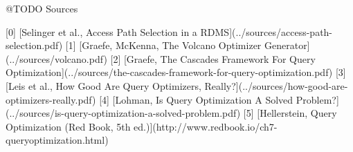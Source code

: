 \documentclass[../index.tex]{subfiles}
\begin{document}
@TODO Sources

[0] [Selinger et al., Access Path Selection in a RDMS](../sources/access-path-selection.pdf)
[1] [Graefe, McKenna, The Volcano Optimizer Generator](../sources/volcano.pdf)
[2] [Graefe, The Cascades Framework For Query Optimization](../sources/the-cascades-framework-for-query-optimization.pdf)
[3] [Leis et al., How Good Are Query Optimizers, Really?](../sources/how-good-are-optimizers-really.pdf)
[4] [Lohman, Is Query Optimization A Solved Problem?](../sources/is-query-optimization-a-solved-problem.pdf)
[5] [Hellerstein, Query Optimization (Red Book, 5th ed.)](http://www.redbook.io/ch7-queryoptimization.html)
\end{document}
